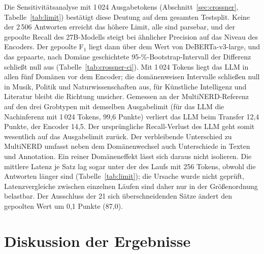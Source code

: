 Die Sensitivitätsanalyse mit 1\,024 Ausgabetokens
(Abschnitt~\ref{sec:crossner}, Tabelle~\ref{tab:limit}) bestätigt diese
Deutung auf dem gesamten Testsplit. Keine der 2\,506 Antworten erreicht
das höhere Limit, alle sind parsebar, und der gepoolte Recall des
27B-Modells steigt bei ähnlicher Precision auf das Niveau des Encoders.
Der gepoolte F$_1$ liegt dann über dem Wert von DeBERTa-v3-large, und
das gepaarte, nach Domäne geschichtete 95-\%-Bootstrap-Intervall der
Differenz schließt null aus (Tabelle~\ref{tab:crossner-ci}).
Mit 1\,024 Tokens liegt das LLM in allen fünf Domänen vor dem Encoder;
die domänenweisen Intervalle schließen null in Musik, Politik und
Naturwissenschaften aus, für Künstliche Intelligenz und Literatur bleibt
die Richtung unsicher.
Gemessen an der MultiNERD-Referenz auf den drei Grobtypen mit demselben
Ausgabelimit (für das LLM die Nachinferenz mit 1\,024 Tokens, 99,6
Punkte) verliert das LLM beim Transfer 12,4 Punkte, der Encoder 14,5.
Der ursprüngliche Recall-Verlust des LLM geht somit wesentlich auf das
Ausgabelimit zurück.
Der verbleibende Unterschied zu MultiNERD umfasst neben dem
Domänenwechsel auch Unterschiede in Texten und Annotation. Ein reiner Domäneneffekt lässt sich daraus
nicht isolieren.
Die mittlere Latenz je Satz lag sogar unter der des
Laufs mit 256 Tokens, obwohl die Antworten länger sind
(Tabelle~\ref{tab:limit}); die Ursache wurde nicht geprüft,
Latenzvergleiche zwischen einzelnen Läufen sind daher nur in der
Größenordnung belastbar.
Der Ausschluss der 21 sich überschneidenden Sätze
ändert den gepoolten Wert um 0,1 Punkte (87,0).

\begin{table}[htbp]
  \centering
  \footnotesize
  \caption[Sensitivitätsanalyse zum Ausgabelimit auf CrossNER]{Sensitivitätsanalyse
  zum Ausgabelimit auf CrossNER: Qwen3.5-27B (QLoRA, drei Seeds) auf
  allen 2\,506 Sätzen mit 256 und 1\,024 Ausgabetokens (nur PER, ORG,
  LOC; strikte Werte in Punkten; F$_1$ als Mittel $\pm$
  Standardabweichung über die Seeds, $\Delta$F$_1$ je Seed gepaart;
  nicht parsebar und Limit erreicht in Prozent der Antworten; Latenz als
  Mittel je Satz in Sekunden; 95-\%-Intervalle der Differenzen in
  Tabelle~\ref{tab:crossner-ci}).
  Gepoolt: Mikrowert über alle Sätze.}
  \label{tab:limit}
  \setlength{\tabcolsep}{3pt}
  
\end{table}

\section{Diskussion der Ergebnisse}
\label{sec:erg-diskussion}

